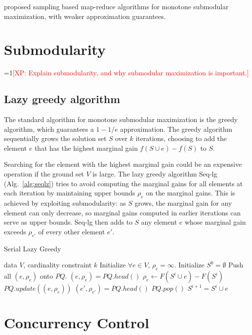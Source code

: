 \documentclass{article}
\newcommand{\Comments}{1}
\newcommand{\note}[2]{\ifnum\Comments=1\textcolor{#1}{#2}\fi}
\newcommand{\xinghao}[1]{\note{red}{[XP: #1]}}
\newcommand{\algref}[1]{Alg.~\ref{#1}}
\newcommand{\seqlz}{Seq-lg}
\begin{document}
\citet{kumar13} proposed sampling based map-reduce algorithms for monotone submodular maximization, with weaker approximation guarantees.

\section{Submodularity}
\label{sec:submodular}
\xinghao{Explain submodularity, and why submodular maximization is important.}

\subsection{Lazy greedy algorithm}
The standard algorithm for monotone submodular maximization is the greedy algorithm, which guarantees a $1 -1/e$ approximation.
The greedy algorithm sequentially grows the solution set $S$ over $k$ iterations, choosing to add the element $e$ that has the highest marginal gain $f(S \cup e) - f(S)$ to $S$.

Searching for the element with the highest marginal gain could be an expensive operation if the ground set $V$ is large.
The lazy greedy algorithm \seqlz{} (\algref{alg:seqlz}) tries to avoid computing the marginal gains for all elements at each iteration by maintaining upper bounds $\rho_e$ on the marginal gains.
This is achieved by exploiting submodularity: as $S$ grows, the marginal gain for any element can only decrease, so marginal gains computed in earlier iterations can serve as upper bounds.
\seqlz{} then adds to $S$ any element $e$ whose marginal gain exceeds $\rho_{e'}$ of every other element $e'$.
\begin{algorithm}[tb]
  \caption{Serial Lazy Greedy}
  \label{alg:seqlz}
\begin{algorithmic}[1]
   data $V$, cardinality constraint $k$
  \STATE Initialize $\forall e \in V$, $\rho_e = \infty$.
  \STATE Initialize $S^0 = \emptyset$
  \STATE Push all $(e, \rho_e)$ onto $PQ$.
      \STATE $(e, \rho_e) = PQ.head()$
      \STATE $\rho_e \leftarrow F(S^i\cup e) - F(S^i)$
      \STATE $PQ.update((e,\rho_e))$
      \STATE $(e', \rho_{e'}) = PQ.head()$
        \STATE $PQ.pop()$
        \STATE $S^{i+1} = S^i \cup e$
      \ENDIF
    \ENDWHILE
  \ENDFOR
\end{algorithmic}
\end{algorithm}


\section{Concurrency Control}
\label{sec:concurrencycontrol}
\end{document}
